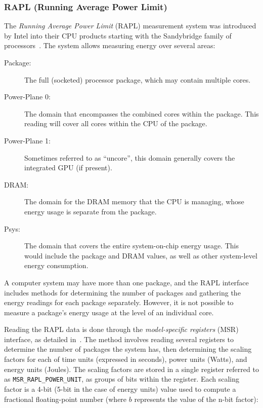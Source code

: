 \subsubsection{RAPL (Running Average Power Limit)}
\label{subsubsec:rapl}

The \textit{Running Average Power Limit} (RAPL) measurement system was introduced by Intel into their CPU products starting with the Sandybridge family of processors~\cite{khan}. The system allows measuring energy over several areas:

\begin{description}
\item[Package:] The full (socketed) processor package, which may contain multiple cores.
\item[Power-Plane 0:] The domain that encompasses the combined cores within the package. This reading will cover all cores within the CPU of the package.
\item[Power-Plane 1:] Sometimes referred to as ``uncore'', this domain generally covers the integrated GPU (if present).
\item[DRAM:] The domain for the DRAM memory that the CPU is managing, whose energy usage is separate from the package.
\item[Psys:] The domain that covers the entire system-on-chip energy usage. This would include the package and DRAM values, as well as other system-level energy consumption.
\end{description}

A computer system may have more than one package, and the RAPL interface includes methods for determining the number of packages and gathering the energy readings for each package separately. However, it is not possible to measure a package's energy usage at the level of an individual core.

Reading the RAPL data is done through the \textit{model-specific registers} (MSR) interface, as detailed in~\cite[Chapter~14]{intel}. The method involves reading several registers to determine the number of packages the system has, then determining the scaling factors for each of time units (expressed in seconds), power units (Watts), and energy units (Joules). The scaling factors are stored in a single register referred to as \texttt{MSR\_RAPL\_POWER\_UNIT}, as groups of bits within the register. Each scaling factor is a 4-bit (5-bit in the case of energy units) value used to compute a fractional floating-point number (where $b$ represents the value of the n-bit factor):

